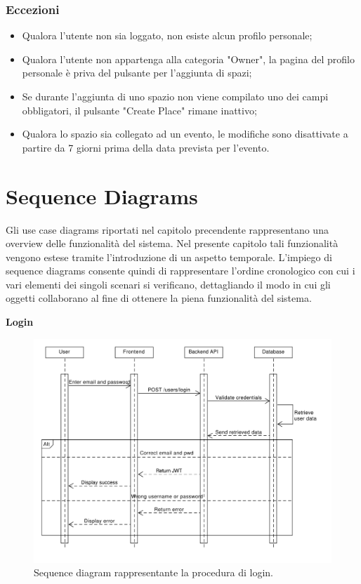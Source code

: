 \documentclass[9pt]{extarticle}
\begin{document}
\subsubsection*{Eccezioni}\label{Eccezioni-FR12-13}
\begin{itemize}
	\item Qualora l'utente non sia loggato, non esiste alcun profilo personale;
	\item Qualora l'utente non appartenga alla categoria "Owner", la pagina del profilo personale è priva del pulsante per l'aggiunta di spazi;
	\item Se durante l'aggiunta di uno spazio non viene compilato uno dei campi obbligatori, il pulsante "Create Place" rimane inattivo;
	\item Qualora lo spazio sia collegato ad un evento, le modifiche sono disattivate a partire da 7 giorni prima della data prevista per l'evento.
\end{itemize}

\newpage
\section{Sequence Diagrams}

Gli use case diagrams riportati nel capitolo precendente rappresentano una overview delle funzionalità del sistema. Nel presente capitolo tali funzionalità vengono estese tramite l'introduzione di un aspetto temporale. L'impiego di sequence diagrams consente quindi di rappresentare l'ordine cronologico con cui i vari elementi dei singoli scenari si verificano, dettagliando il modo in cui gli oggetti collaborano al fine di ottenere la piena funzionalità del sistema.

\textbf{Login}
\begin{figure}[!htb]
	\centering
	\includegraphics[width=\linewidth]{./images/SequenceDiagramLogin.pdf}
	\caption{Sequence diagram rappresentante la procedura di login.}
	\label{fig:SeqDiagLogin}
\end{figure}
\end{document}
